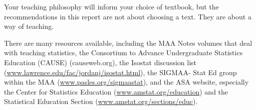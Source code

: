 Your teaching philosophy will inform your choice of textbook, but the recommendations in this report are not about choosing a text.  They are about a way of teaching. 
 
There are many resources available, including the MAA Notes volumes that deal with teaching statistics, the Consortium to Advance Undergraduate Statistics Education (CAUSE) (causeweb.org), the Isostat discussion list (\url{www.lawrence.edu/fac/jordanj/isostat.html}), the SIGMAA- Stat Ed group within the MAA (\url{www.pasles.org/sigmaastat}), and the ASA website, especially the Center for Statistics Education (\url{www.amstat.org/education}) and the Statistical Education Section (\url{www.amstat.org/sections/educ}).
